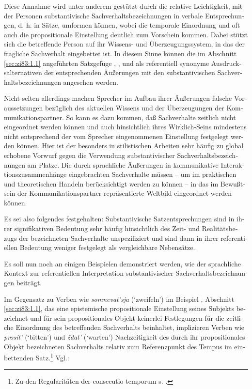 \documentclass[output=paper]{langscibook}
\begin{document}
\begin{otherlanguage}{german}
Diese Annahme wird unter anderem gestützt durch die relative Leichtigkeit, mit der Personen substantivische Sachverhaltsbezeichnungen in verbale Ent\-spre\-chun\-gen, d. h. in Sätze, umformen können, wobei die temporale Einordnung und oft auch die propositionale Einstellung deutlich zum Vorschein kommen. Dabei stützt sich die betreffende Person auf ihr Wissens- und Überzeugungssystem, in das der fragliche Sachverhalt eingebettet ist. In diesem Sinne können die im Abschnitt \ref{sec:zi83:1.1} angeführten Satzgefüge , ,  und  als referentiell sy\-no\-ny\-me Ausdrucksalternativen der entsprechenden Äußerungen mit den substantivischen Sachverhaltsbezeichnungen angesehen werden.

Nicht selten allerdings machen Sprecher im Aufbau ihrer Äußerungen falsche Voraussetzungen bezüglich des aktuellen Wissens und der Überzeugungen der Kommunikationspartner. So kann es dazu kommen, daß Sachverhalte zeitlich nicht eingeordnet werden können und auch hinsichtlich ihres Wirklich-Seins mindestens nicht entsprechend der vom Sprecher eingenommenen Einstellung festgelegt werden können. Hier ist der besonders in stilistischen Arbeiten sehr häufig zu global erhobene Vorwurf gegen die Verwendung substantivischer Sachverhaltsbezeichnungen am Platze. Die durch sprachliche Äußerungen in kommunikative Interaktionszusammenhänge eingebrachten Sachverhalte müssen -- um im praktischen und theoretischen Handeln berücksichtigt werden zu können -- in das im Bewußtsein der Kommunikationspartner repräsentierte Weltbild eingeordnet werden können.

Es sei also folgendes festgehalten: Substantivische Satzentsprechungen sind in ihrer signifikativen Bedeutung sehr häufig hinsichtlich des Zeit- und Rea\-li\-täts\-be\-zugs der bezeichneten Sachverhalte unspezifiziert und sind dann in ihrer referentiellen Bedeutung weniger festgelegt als vergleichbare Nebensätze.

Es soll nun noch an einigen Beispielen demonstriert werden, wie der sprachliche Kontext zur referentiellen Interpretation substantivischer Sachverhaltsbezeichnungen beiträgt.


Im Gegensatz zu Verben wie \textit{somnevat’sja} (‘zweifeln’) im Beispiel , Abschnitt \ref{sec:zi83:1.1}, das eine epistemische propositionale Einstellung seines Subjekts bezeichnet und für sein propositionales Objekt keinerlei Festlegungen für die zeitliche Einordnung des betreffenden Sachverhalts beinhaltet, implizieren Verben wie \textit{prosit’} (‘bitten’) und \textit{ždat’} (‘warten’) Nachzeitigkeit des durch ihr propositionales Objekt bezeichneten Sachverhalts relativ zum Referenzpunkt des Tempus im einbettenden Satz.\footnote{Zu den Regularitäten der consecutio temporum s. \citet{steube1980die-consecutio-temporum-im-deutschen-als-ausdruck-eines-komplexen-zuordnungsverhaltnisses-von-zeichenfolge-und-bedeutungsstruktur}.} Vgl.:


\end{otherlanguage}
\end{document}
